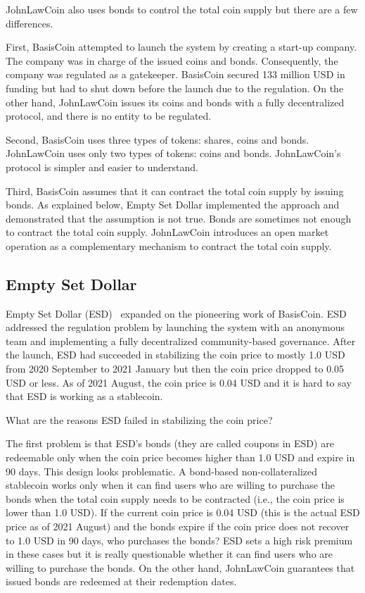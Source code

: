 \documentclass[dvipdfmx,a4paper]{article}
\begin{document}
JohnLawCoin also uses bonds to control the total coin supply but there are a few differences.

First, BasisCoin attempted to launch the system by creating a start-up company. The company was in charge of the issued coins and bonds. Consequently, the company was regulated as a gatekeeper. BasisCoin secured 133 million USD in funding but had to shut down before the launch due to the regulation. On the other hand, JohnLawCoin issues its coins and bonds with a fully decentralized protocol, and there is no entity to be regulated.

Second, BasisCoin uses three types of tokens: shares, coins and bonds. JohnLawCoin uses only two types of tokens: coins and bonds. JohnLawCoin's protocol is simpler and easier to understand.

Third, BasisCoin assumes that it can contract the total coin supply by issuing bonds. As explained below, Empty Set Dollar implemented the approach and demonstrated that the assumption is not true. Bonds are sometimes not enough to contract the total coin supply. JohnLawCoin introduces an open market operation as a complementary mechanism to contract the total coin supply.

\subsection{Empty Set Dollar}

Empty Set Dollar (ESD)~\cite{emptysetdollar} expanded on the pioneering work of BasisCoin. ESD addressed the regulation problem by launching the system with an anonymous team and implementing a fully decentralized community-based governance. After the launch, ESD had succeeded in stabilizing the coin price to mostly 1.0 USD from 2020 September to 2021 January but then the coin price dropped to 0.05 USD or less. As of 2021 August, the coin price is 0.04 USD and it is hard to say that ESD is working as a stablecoin.

What are the reasons ESD failed in stabilizing the coin price?

The first problem is that ESD's bonds (they are called coupons in ESD) are redeemable only when the coin price becomes higher than 1.0 USD and expire in 90 days. This design looks problematic. A bond-based non-collateralized stablecoin works only when it can find users who are willing to purchase the bonds when the total coin supply needs to be contracted (i.e., the coin price is lower than 1.0 USD). If the current coin price is 0.04 USD (this is the actual ESD price as of 2021 August) and the bonds expire if the coin price does not recover to 1.0 USD in 90 days, who purchases the bonds? ESD sets a high risk premium in these cases but it is really questionable whether it can find users who are willing to purchase the bonds. On the other hand, JohnLawCoin guarantees that issued bonds are redeemed at their redemption dates.
\end{document}
